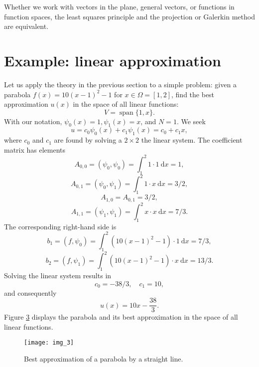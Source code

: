 \documentclass[../main.tex]{subfiles}
\begin{document}
	Whether we work with vectors in the plane, general vectors, or functions in function spaces, the least squares principle and the projection or Galerkin method are equivalent.
	
	\section[Example: linear approximation]{Example: linear approximation}
	\label{sec:sec_2_3}
	\noindent Let us apply the theory in the previous section to a simple problem: given a parabola $f(x)=10(x-1)^{2}-1$ for $x \in \Omega=[1,2]$, find the best approximation $u(x)$ in the space of all linear functions:
	$$
	V=\operatorname{span}\{1, x\} .
	$$
	With our notation, $\psi_{0}(x)=1, \psi_{1}(x)=x$, and $N=1$. We seek
	$$
	u=c_{0} \psi_{0}(x)+c_{1} \psi_{1}(x)=c_{0}+c_{1} x,
	$$
	where $c_{0}$ and $c_{1}$ are found by solving a $2 \times 2$ the linear system. The coefficient matrix has elements
	\begin{equation}\label{eqa31}
		A_{0,0}=\left(\psi_{0}, \psi_{0}\right)=\int_{1}^{2} 1 \cdot 1 \mathrm{~d} x=1,
	\end{equation}
	\begin{equation}\label{eqa32}
		A_{0,1}=\left(\psi_{0}, \psi_{1}\right)=\int_{1}^{2} 1 \cdot x \mathrm{~d} x=3/2,
	\end{equation}
	\begin{equation}\label{eqa33}
		A_{1,0}=A_{0,1}=3 / 2,
	\end{equation}
	\begin{equation}\label{eqa34}
		A_{1,1}=\left(\psi_{1}, \psi_{1}\right)=\int_{1}^{2} x \cdot x \mathrm{~d} x=7 / 3.
	\end{equation}
	The corresponding right-hand side is
	\begin{equation}\label{eqa35}
		b_{1}=\left(f, \psi_{0}\right)=\int_{1}^{2}\left(10(x-1)^{2}-1\right) \cdot 1 \mathrm{~d} x=7 / 3,
	\end{equation}
	\begin{equation}\label{eqa36}
		b_{2}=\left(f, \psi_{1}\right)=\int_{1}^{2}\left(10(x-1)^{2}-1\right) \cdot x \mathrm{~d} x=13 / 3.
	\end{equation}
	Solving the linear system results in
	\begin{equation}\label{eqa37}
		c_{0}=-38 / 3, \quad c_{1}=10,
	\end{equation}
	and consequently
	\begin{equation}\label{eqa38}
		u(x)=10 x-\frac{38}{3}.
	\end{equation}
	Figure \hyperref[fig:img_3]{3} displays the parabola and its best approximation in the space of all linear functions.
	\begin{figure}[H]
		\centering
		\texttt{[image: img\_3]}
		\caption{Best approximation of a parabola by a straight line.}
		\label{fig:img_3}
	\end{figure}
\end{document}
